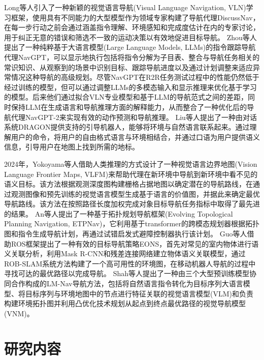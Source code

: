 	
	Long\cite{long2024discuss}等人引入了一种新颖的视觉语言导航(Visual Language Navigation, VLN)学习框架，使用具有不同能力的大型模型作为领域专家构建了导航代理DiscussNav，在每一步行动之前会通过涵盖指令理解、环境感知和完成度估计在内的专家讨论，用于纠正无意的错误和筛选不一致的运动决策以有效地促进目标导航。
	Zhou\cite{zhou2024navgpt1}等人提出了一种纯粹基于大语言模型(Large Language Models, LLMs)的指令跟踪导航代理NavGPT，可以显示地执行包括将指令分解为子目表、整合与导航任务相关的常识知识、从观察到的场景中识别目标、跟踪导航进度以及通过计划调整来适应异常情况这种导航的高级规划。尽管NavGPT在R2R任务测试过程中的性能仍然低于经过训练的模型，但可以通过调整LLMs的多模态输入和显示推理来优化基于学习的模型。后来他们通过拟合VLN专业模型和基于LLM的导航范式之间的差距，同时保持LLM在生成语言和导航推理方面的解释能力，从而整合了一种优化后的导航代理NavGPT-2\cite{zhou2024navgpt2}来实现有效的动作预测和导航推理。
	Liu\cite{liu2024dragon}等人提出了一种由对话系统DRAGON提供支持的引导机器人，能够将环境与自然语言联系起来。通过理解用户的命令，将用户的自由格式语言与环境相结合，并通过口语为用户提供语义信息，引导用户在地图上找到所需的地标。

	

    
	2024年，Yokoyama\cite{yokoyama2024vlfm}等人借助人类推理的方式设计了一种视觉语言边界地图(Vision Language Frontier Maps, VLFM)来帮助代理在新环境中导航到新环境中看不见的语义目标。该方法根据观测深度图构建栅格占据地图以确定潜在的导航路线，在通过观测图像和预先训练的视觉语言模型生成基于语言的价值图，并据此来确定最优导航路线。该方法在按照路径长度加权完成对象目标导航任务指标中取得了最先进的结果。
	An\cite{an2024etpnav}等人提出了一种基于拓扑规划导航框架(Evolving Topological Planning Navigation, ETPNav)，它利用基于transformer的跨模态规划器根据拓扑图和指令生成导航计划，再通过试错启发式避障控制器执行该计划。
	Guo\cite{electronics11071136}等人借助ROS框架提出了一种有效的目标导航策略EONS，首先对常见的室内物体进行语义关联分析，利用Mask R-CNN和残差连接网络建立物体语义关联模型，通过ROB-SLAM系统方法构建了一个高可用性的环境图，在移动机器人导航的过程中寻找可达的最优路径以完成导航。
    Shah\cite{shah2021ving, shah2023lm}等人提出了一种由三个大型预训练模型协同合作构成的LM-Nav导航方法，包括将自然语言指令转化为目标序列大语言模型、将目标序列与环境地图中的节点进行特征关联的视觉语言模型(VLM)和负责构建环境拓扑图并利用凸优化技术规划从起点到终点最优路径的视觉导航模型(VNM)。



\section{研究内容}

